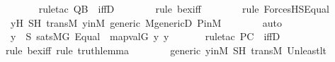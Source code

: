 \begin{isabellebody}
\ \ \ \ \ \ \isamarkupfalse%
{\isacharparenleft}{\kern0pt}rule{\isacharunderscore}{\kern0pt}tac\ Q{\isacharequal}{\kern0pt}{\isachardoublequoteopen}{\isacharquery}{\kern0pt}B{\isachardoublequoteclose}\ \ iffD{}{\isacharparenright}{\kern0pt}\isanewline
\ \ \ \ \ \ \ \isamarkupfalse%
{\isacharparenleft}{\kern0pt}rule\ bex{\isacharunderscore}{\kern0pt}iff{\isacharparenright}{\kern0pt}{\isacharplus}{\kern0pt}\isanewline
\ \ \ \ \ \ \ \isamarkupfalse%
{\isacharparenleft}{\kern0pt}rule\ ForcesHS{\isacharunderscore}{\kern0pt}Equal{\isacharparenright}{\kern0pt}\isanewline
\ \ \ \ \ \ \isamarkupfalse%
\ y{\isacharprime}{\kern0pt}H\ SH\ transM\ y{\isacharprime}{\kern0pt}inM\ generic\ M{\isacharunderscore}{\kern0pt}genericD\ P{\isacharunderscore}{\kern0pt}in{\isacharunderscore}{\kern0pt}M\isanewline
\ \ \ \ \ \ \isamarkupfalse%
\ auto\isanewline
\ \ \ \ \isamarkupfalse%
\ \isamarkupfalse%
\ {\isachardoublequoteopen}{\isasymexists}y{\isacharprime}{\kern0pt}{\isacharprime}{\kern0pt}{\isacharprime}{\kern0pt}\ {\isasymin}\ S{\isachardot}{\kern0pt}\ sats{\isacharparenleft}{\kern0pt}M{\isacharbrackleft}{\kern0pt}G{\isacharbrackright}{\kern0pt}{\isacharcomma}{\kern0pt}\ Equal{\isacharparenleft}{\kern0pt}{}{\isacharcomma}{\kern0pt}\ {}{\isacharparenright}{\kern0pt}{\isacharcomma}{\kern0pt}\ map{\isacharparenleft}{\kern0pt}val{\isacharparenleft}{\kern0pt}G{\isacharparenright}{\kern0pt}{\isacharcomma}{\kern0pt}\ {\isacharbrackleft}{\kern0pt}y{\isacharprime}{\kern0pt}{\isacharcomma}{\kern0pt}\ y{\isacharprime}{\kern0pt}{\isacharprime}{\kern0pt}{\isacharprime}{\kern0pt}{\isacharbrackright}{\kern0pt}{\isacharparenright}{\kern0pt}{\isacharparenright}{\kern0pt}{\isachardoublequoteclose}\isanewline
\ \ \ \ \ \ \isamarkupfalse%
{\isacharparenleft}{\kern0pt}rule{\isacharunderscore}{\kern0pt}tac\ P{\isacharequal}{\kern0pt}{\isachardoublequoteopen}{\isacharquery}{\kern0pt}C{\isachardoublequoteclose}\ \ iffD{}{\isacharparenright}{\kern0pt}\isanewline
\ \ \ \ \ \ \ \isamarkupfalse%
{\isacharparenleft}{\kern0pt}rule\ bex{\isacharunderscore}{\kern0pt}iff{\isacharcomma}{\kern0pt}\ rule\ truth{\isacharunderscore}{\kern0pt}lemma{\isacharparenright}{\kern0pt}\isanewline
\ \ \ \ \ \ \isamarkupfalse%
\ generic\ y{\isacharprime}{\kern0pt}inM\ SH\ transM\ Un{\isacharunderscore}{\kern0pt}least{\isacharunderscore}{\kern0pt}lt\isanewline
\ \ \ \ \ \ \isamarkupfalse%

\end{isabellebody}
